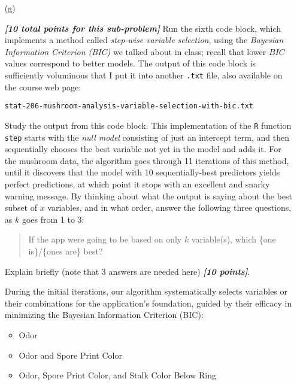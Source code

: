 \documentclass[12pt]{article}
\newcommand{\bi}[1]{\b{\i{#1}}}
\renewcommand{\b}[1]{\textbf{#1}}
\renewcommand{\i}[1]{\textit{#1}}
\begin{document}
\begin{itemize}

\item[(g)]

\bi{[10 total points for this sub-problem]} Run the sixth code block, which implements a method called \textit{step-wise variable selection}, using the \textit{Bayesian Information Criterion (BIC)} we talked about in class; recall that lower $BIC$ values correspond to better models. The output of this code block is sufficiently voluminous that I put it into another \texttt{.txt} file, also available on the course web page:

\hspace*{0.75in} \texttt{stat-206-mushroom-analysis-variable-selection-with-bic.txt}

Study the output from this code block. This implementation of the \texttt{R} function \texttt{step} starts with the \textit{null model} consisting of just an intercept term, and then sequentially chooses the best variable not yet in the model and adds it. For the mushroom data, the algorithm goes through 11 iterations of this method, until it discovers that the model with 10 sequentially-best predictors yields perfect predictions, at which point it stops with an excellent and snarky warning message. By thinking about what the output is saying about the best subset of $x$ variables, and in what order, answer the following three questions, as $k$ goes from 1 to 3: 

\begin{quote}

If the app were going to be based on only $k$ variable(s), which \{one is\}/\{ones are\} best?

\end{quote}

Explain briefly (note that 3 answers are needed here) \bi{[10 points]}. 

{\color{blue}
During the initial iterations, our algorithm systematically selects variables or their combinations for the application's foundation, guided by their efficacy in minimizing the Bayesian Information Criterion (BIC):

\begin{itemize}
    \item Odor
    \item Odor and Spore Print Color
    \item Odor, Spore Print Color, and Stalk Color Below Ring
\end{itemize}

}
\end{itemize}
\end{document}
